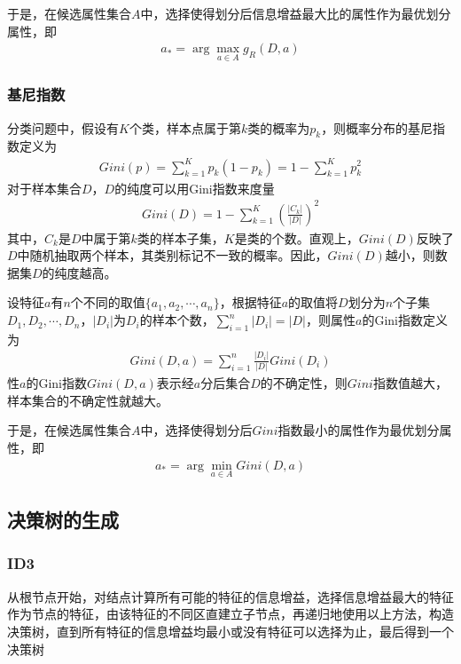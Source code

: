 于是，在候选属性集合$A$中，选择使得划分后信息增益最大比的属性作为最优划分属性，即
\begin{eqnarray}
a_*=\arg\max_{a\in A}g_R(D,a)
\end{eqnarray}

\subsubsection{基尼指数}
分类问题中，假设有$K$个类，样本点属于第$k$类的概率为$p_k$，则概率分布的基尼指数定义为
\begin{eqnarray}
Gini(p)=\sum_{k=1}^K p_k(1-p_k)=1-\sum_{k=1}^K p_k^2
\end{eqnarray}
对于样本集合$D$，$D$的纯度可以用Gini指数来度量
\begin{eqnarray}
Gini(D)=1-\sum_{k=1}^K \left( \frac{|C_k|}{|D|} \right)^2
\end{eqnarray}
其中，$C_k$是$D$中属于第$k$类的样本子集，$K$是类的个数。直观上，$Gini(D)$反映了$D$中随机抽取两个样本，其类别标记不一致的概率。因此，$Gini(D)$越小，则数据集$D$的纯度越高。

设特征$a$有$n$个不同的取值$\{ a_1,a_2,\cdots,a_n \}$，根据特征$a$的取值将$D$划分为$n$个子集$D_1,D_2,\cdots,D_n$，$|D_i|$为$D_i$的样本个数，$\sum_{i=1}^n|D_i|=|D|$，则属性$a$的Gini指数定义为
\begin{eqnarray}
Gini(D,a)=\sum_{i=1}^n \frac{|D_i|}{|D|}Gini(D_i)
\end{eqnarray}
性$a$的Gini指数$Gini(D,a)$表示经$a$分后集合$D$的不确定性，则$Gini$指数值越大，样本集合的不确定性就越大。

于是，在候选属性集合$A$中，选择使得划分后$Gini$指数最小的属性作为最优划分属性，即
\begin{eqnarray}
a_*=\arg\min_{a\in A}Gini(D,a)
\end{eqnarray}

\subsection{决策树的生成}
\subsubsection{ID3}
从根节点开始，对结点计算所有可能的特征的信息增益，选择信息增益最大的特征作为节点的特征，由该特征的不同区直建立子节点，再递归地使用以上方法，构造决策树，直到所有特征的信息增益均最小或没有特征可以选择为止，最后得到一个决策树
